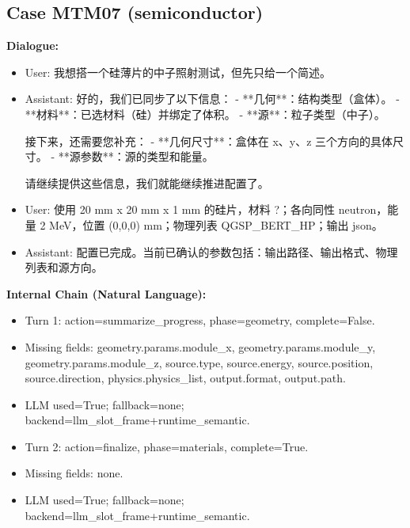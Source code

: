 \documentclass[11pt]{ctexart}
\begin{document}
\subsection{Case MTM07 (semiconductor)}
\textbf{Dialogue:}
\begin{itemize}
\item User: 我想搭一个硅薄片的中子照射测试，但先只给一个简述。
\item Assistant: 好的，我们已同步了以下信息：
- **几何**：结构类型（盒体）。
- **材料**：已选材料（硅）并绑定了体积。
- **源**：粒子类型（中子）。

接下来，还需要您补充：
- **几何尺寸**：盒体在 x、y、z 三个方向的具体尺寸。
- **源参数**：源的类型和能量。

请继续提供这些信息，我们就能继续推进配置了。
\item User: 使用 20 mm x 20 mm x 1 mm 的硅片，材料 ?；各向同性 neutron，能量 2 MeV，位置 (0,0,0) mm；物理列表 QGSP\_BERT\_HP；输出 json。
\item Assistant: 配置已完成。当前已确认的参数包括：输出路径、输出格式、物理列表和源方向。
\end{itemize}
\textbf{Internal Chain (Natural Language):}
\begin{itemize}
\item Turn 1: action=summarize\_progress, phase=geometry, complete=False.
\item Missing fields: geometry.params.module\_x, geometry.params.module\_y, geometry.params.module\_z, source.type, source.energy, source.position, source.direction, physics.physics\_list, output.format, output.path.
\item LLM used=True; fallback=none; backend=llm\_slot\_frame+runtime\_semantic.
\item Turn 2: action=finalize, phase=materials, complete=True.
\item Missing fields: none.
\item LLM used=True; fallback=none; backend=llm\_slot\_frame+runtime\_semantic.
\end{itemize}
\end{document}
